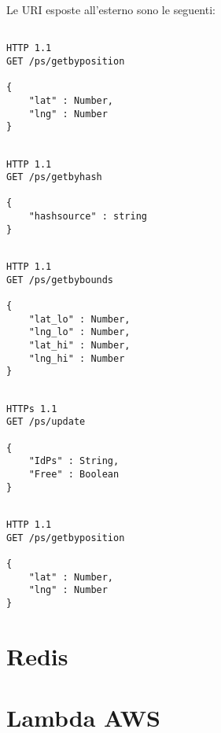 \vspace{0.5truecm}
Le URI esposte all'esterno sono le seguenti:

\lstset{language=HTTP}          

\begin{lstlisting}[frame=single]

HTTP 1.1 
GET /ps/getbyposition

{
	"lat" : Number,
	"lng" : Number
}

\end{lstlisting}

\vspace{1truecm}
\begin{lstlisting}[frame=single]

HTTP 1.1 
GET /ps/getbyhash

{
	"hashsource" : string
}

\end{lstlisting}


\begin{lstlisting}[frame=single]

HTTP 1.1 
GET /ps/getbybounds

{
	"lat_lo" : Number,
	"lng_lo" : Number,
	"lat_hi" : Number,
	"lng_hi" : Number
}

\end{lstlisting}


\begin{lstlisting}[frame=single]

HTTPs 1.1 
GET /ps/update

{
	"IdPs" : String,
	"Free" : Boolean
}

\end{lstlisting}

\begin{lstlisting}[frame=single]

HTTP 1.1 
GET /ps/getbyposition

{
	"lat" : Number,
	"lng" : Number
}

\end{lstlisting}





\section{Redis}

\section{Lambda AWS}



